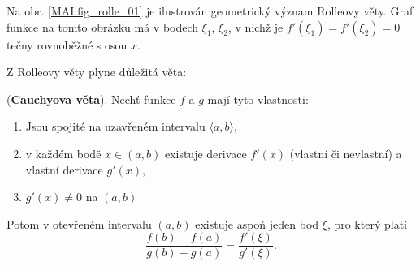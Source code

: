       \begin{note}
        Na obr. \ref{MAI:fig_rolle_01} je ilustrován geometrický význam Rolleovy věty. Graf funkce na tomto obrázku má v bodech $\xi_1$, $\xi_2$, v nichž je 
        $f'(\xi_1)=f'(\xi_2)=0$ tečny rovnoběžné s osou $x$. 
            
      \end{note}
      
      Z Rolleovy věty plyne důležitá věta:
      
      \begin{lemma}\label{MA1:lem_diff04}
        (\textbf{Cauchyova věta}). Nechť funkce $f$ a $g$ mají tyto vlastnosti:
        \begin{enumerate}
          \item  Jsou spojité na uzavřeném intervalu $\langle a,b\rangle$,
          \item  v každém bodě $x\in(a,b)$ existuje derivace $f'(x)$ (vlastní či nevlastní) a vlastní derivace $g'(x)$,
          \item  $g'(x)\neq0$ na $(a,b)$
        \end{enumerate}
        Potom v otevřeném intervalu $(a,b)$ existuje aspoň jeden bod $\xi$, pro který platí
        \begin{equation}\label{MA1:eq_diff03}
          \frac{f(b)-f(a)}{g(b)-g(a)} = \frac{f'(\xi)}{g'(\xi)}.
        \end{equation} 
      \end{lemma} 
      
